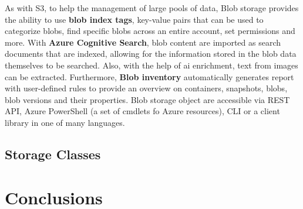 As with S3, to help the management of large pools of data, Blob storage provides the ability to use \textbf{blob index tags}, key-value pairs that can be used to categorize blobs, find specific blobs across an entire account, set  permissions and more. With \textbf{Azure Cognitive Search}, blob content are imported as search documents that are indexed, allowing for the information stored in the blob data themselves to be searched. Also, with the help of \ac{ai} enrichment, text from images can be extracted. Furthermore,  \textbf{Blob inventory} automatically generates report with user-defined rules to provide an overview on containers, snapshots, blobs, blob versions and their properties. Blob storage object are accessible via REST API, Azure PowerShell (a set of cmdlets fo Azure resources)\cite{powershell}, CLI or a client library in one of many languages. \cite{blobinfo}

\subsection{Storage Classes}


\section{Conclusions}